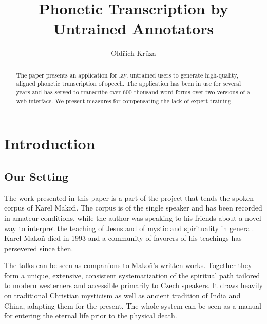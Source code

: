 \documentclass{itatnew}
\begin{document}
\title{Phonetic Transcription by Untrained Annotators}

\author{Oldřich Krůza}


\maketitle              %

\begin{abstract}
The paper presents an application for lay, untrained users to generate
high-quality, aligned phonetic transcription of speech. The application has been in use
for several years and has served to transcribe over 600 thousand word forms over
two versions of a web interface. We present measures for compensating the lack of expert training.
\end{abstract}

\section{Introduction}

\subsection{Our Setting}

The work presented in this paper is a part of the project that tends the spoken
corpus of Karel Mako\v{n}\cite{hajek2007cesky}. The corpus is of the single
speaker and has been recorded in amateur conditions, while the author was
speaking to his friends about a novel way to interpret the teaching of Jesus and
of mystic and spirituality in general. Karel Makoň died in 1993 and a community
of favorers of his teachings has persevered since then.

The talks can be seen as companions to Makoň's written works. Together they form
a unique, extensive, consistent systematization of the spiritual path tailored
to modern westerners and accessible primarily to Czech speakers. It draws
heavily on traditional Christian mysticism as well as ancient tradition of India
and China, adapting them for the present. The whole system can be seen as a
manual for entering the eternal life prior to the physical death.
\end{document}
